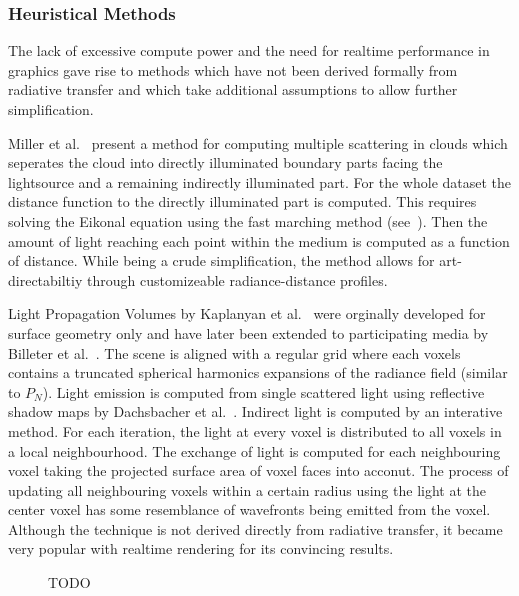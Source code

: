 \subsubsection*{Heuristical Methods}

The lack of excessive compute power and the need for realtime performance in graphics gave rise to methods which have not been derived formally from radiative transfer and which take additional assumptions to allow further simplification.

Miller et al.~\cite{Miller12} present a method for computing multiple scattering in clouds which seperates the cloud into directly illuminated boundary parts facing the lightsource and a remaining indirectly illuminated part. For the whole dataset the distance function to the directly illuminated part is computed. This requires solving the Eikonal equation using the fast marching method (see~\cite{Tsitsiklis95}). Then the amount of light reaching each point within the medium is computed as a function of distance. While being a crude simplification, the method allows for art-directabiltiy through customizeable radiance-distance profiles.

Light Propagation Volumes by Kaplanyan et al.~\cite{Kaplanyan10} were orginally developed for surface geometry only and have later been extended to participating media by Billeter et al.~\cite{Billeter12}. The scene is aligned with a regular grid where each voxels contains a truncated spherical harmonics expansions of the radiance field (similar to $P_N$). Light emission is computed from single scattered light using reflective shadow maps by Dachsbacher et al.~\cite{Dachsbacher05}. Indirect light is computed by an interative method. For each iteration, the light at every voxel is distributed to all voxels in a local neighbourhood. The exchange of light is computed for each neighbouring voxel taking the projected surface area of voxel faces into acconut. The process of updating all neighbouring voxels within a certain radius using the light at the center voxel has some resemblance of wavefronts being emitted from the voxel. Although the technique is not derived directly from radiative transfer, it became very popular with realtime rendering for its convincing results.


\begin{figure}[t]
\centering
{}
\caption{TODO}
\label{fig:rte_change_L_all}
\end{figure}

